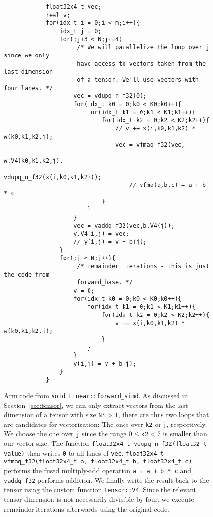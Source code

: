 \documentclass{article}
\numberwithin{equation}{section}
\numberwithin{figure}{section}
\numberwithin{table}{section}
\begin{document}
    \begin{figure}[htb]
        \begin{verbatim}
            float32x4_t vec;
            real v;
            for(idx_t i = 0;i < m;i++){
                idx_t j = 0;
                for(;j+3 < N;j+=4){
                     /* We will parallelize the loop over j since we only
                     have access to vectors taken from the last dimension
                     of a tensor. We'll use vectors with four lanes. */
                    vec = vdupq_n_f32(0);
                    for(idx_t k0 = 0;k0 < K0;k0++){
                        for(idx_t k1 = 0;k1 < K1;k1++){
                            for(idx_t k2 = 0;k2 < K2;k2++){
                                // v += x(i,k0,k1,k2) * w(k0,k1,k2,j);
                                vec = vfmaq_f32(vec,
                                                w.V4(k0,k1,k2,j),
                                                vdupq_n_f32(x(i,k0,k1,k2)));
                                    // vfma(a,b,c) = a + b * c
                            }
                        }
                    }
                    vec = vaddq_f32(vec,b.V4(j));
                    y.V4(i,j) = vec;
                    // y(i,j) = v + b(j);
                }
                for(;j < N;j++){
                     /* remainder iterations - this is just the code from
                     forward_base. */
                    v = 0;
                    for(idx_t k0 = 0;k0 < K0;k0++){
                        for(idx_t k1 = 0;k1 < K1;k1++){
                            for(idx_t k2 = 0;k2 < K2;k2++){
                                v += x(i,k0,k1,k2) * w(k0,k1,k2,j);
                            }
                        }
                    }
                    y(i,j) = v + b(j);
                }
            }
        \end{verbatim}
        \caption{Arm code from \texttt{void Linear::forward_simd}. As discussed in Section~\ref{sec:tensor}, we can
        only extract vectors from the last dimension of a tensor with size $\texttt{Ni} > 1$, there are thus two
        loops that are candidates for vectorization: The ones over \texttt{k2} or \texttt{j}, respectively.
        We choose the one over \texttt{j} since the range $0 \leq \texttt{k2} < 3$ is smaller than our
        vector size. The function \texttt{float32x4_t vdupq_n_f32(float32_t value)} then writes \texttt{0}
        to all lanes of \texttt{vec}. \texttt{float32x4_t vfmaq_f32(float32x4_t a, float32x4_t b, float32x4_t c)}
        performs the fused multiply-add operation \texttt{a = a + b * c} and \texttt{vaddq_f32} performs
        addition. We finally write the result back to the tensor using the custom function \texttt{tensor::V4}. Since
        the relevant tensor dimension is not necessarily divisible by four, we execute remainder iterations afterwards
        using the original code.}
        \label{layers:code:forward_simd}
    \end{figure}
\end{document}
